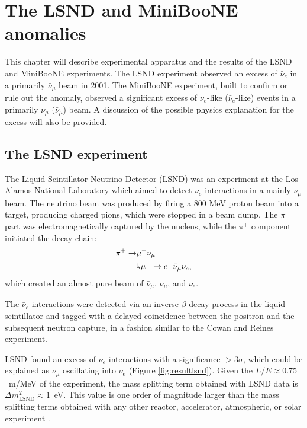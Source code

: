 \chapter{The LSND and MiniBooNE anomalies}

\minitoc

This chapter will describe experimental apparatus and the results of the LSND and MiniBooNE experiments. The LSND experiment observed an excess of $\bar{\nu}_{e}$ in a primarily $\bar{\nu}_{\mu}$ beam in 2001. The MiniBooNE experiment, built to confirm or rule out the anomaly, observed a significant excess of $\nu_{e}$-like ($\bar{\nu}_{e}$-like) events in a primarily $\nu_{\mu}$ ($\bar{\nu}_{\mu}$) beam. A discussion of the possible physics explanation for the excess will also be provided.

\section{The LSND experiment}
The Liquid Scintillator Neutrino Detector (LSND) was an experiment at the Los Alamos National Laboratory which aimed to detect $\bar{\nu}_e$ interactions in a mainly $\bar{\nu}_{\mu}$ beam. The neutrino beam was produced by firing a 800 MeV proton beam into a target, producing charged pions, which were stopped in a beam dump. The $\pi^-$ part was electromagnetically captured by the nucleus, while the $\pi^+$ component initiated the decay chain:
\begin{align}
    \pi^+ \rightarrow & \mu^+\nu_{\mu}\\
    & \rotatebox[origin=c]{180}{$\Lsh$}	 \mu^{+} \rightarrow e^+\bar{\nu}_{\mu}\nu_{e},
\end{align}
which created an almost pure beam of $\bar{\nu}_{\mu}$, $\nu_{\mu}$, and $\nu_e$.

The $\bar{\nu}_e$ interactions were detected via an inverse $\beta$-decay process in the liquid scintillator and tagged with a delayed coincidence between the positron and the subsequent neutron capture, in a fashion similar to the Cowan and Reines experiment. 

LSND found an excess of $\bar{\nu}_e$ interactions with a significance $>3\sigma$, which could be explained as $\bar{\nu}_\mu$ oscillating into $\bar{\nu}_e$ (Figure \ref{fig:resultlsnd}). Given the $L/E\approx0.75$~m/MeV of the experiment, the mass splitting term obtained with LSND data is $\Delta m_{\mathrm{LSND}}^2\approx1$~eV. This value is one order of magnitude larger than the mass splitting terms obtained with any other reactor, accelerator, atmospheric, or solar experiment \cite{Aguilar:2001ty}. 

